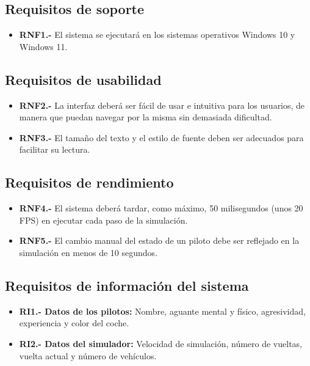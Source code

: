 \subsection{Requisitos de soporte}

\begin{itemize}
    \item \textbf{RNF1.-} El sistema se ejecutará en los sistemas operativos Windows 10 y Windows 11.
\end{itemize}

\subsection{Requisitos de usabilidad}

\begin{itemize}
    \item \textbf{RNF2.-} La interfaz deberá ser fácil de usar e intuitiva para los usuarios, de manera que puedan navegar por la misma sin demasiada dificultad.
    \item \textbf{RNF3.-} El tamaño del texto y el estilo de fuente deben ser adecuados para facilitar su lectura.
\end{itemize}

\subsection{Requisitos de rendimiento}

\begin{itemize}
    \item \textbf{RNF4.-} El sistema deberá tardar, como máximo, 50 milisegundos (unos 20 FPS) en ejecutar cada paso de la simulación.
    \item \textbf{RNF5.-} El cambio manual del estado de un piloto debe ser reflejado en la simulación en menos de 10 segundos.
\end{itemize}

\subsection{Requisitos de información del sistema}

\begin{itemize}
    \item \textbf{RI1.- Datos de los pilotos:} Nombre, aguante mental y físico, agresividad, experiencia y color del coche.
    \item \textbf{RI2.- Datos del simulador:} Velocidad de simulación, número de vueltas, vuelta actual y número de vehículos.
\end{itemize}

